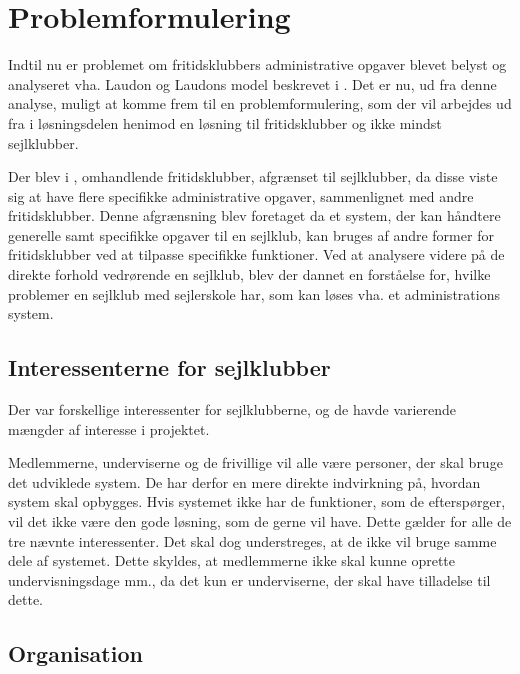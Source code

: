 \chapter{Problemformulering}\label{chap:problemformulering-new}

Indtil nu er problemet om fritidsklubbers administrative opgaver blevet belyst og analyseret vha. Laudon og Laudons model beskrevet i . 
Det er nu, ud fra denne analyse, muligt at komme frem til en problemformulering, som der vil arbejdes ud fra i løsningsdelen henimod en løsning til fritidsklubber og ikke mindst sejlklubber.

Der blev i , omhandlende fritidsklubber, afgrænset til sejlklubber, da disse viste sig at have flere specifikke administrative opgaver, sammenlignet med andre fritidsklubber. 
Denne afgrænsning blev foretaget da et system, der kan håndtere generelle samt specifikke opgaver til en sejlklub, kan bruges af andre former for fritidsklubber ved at tilpasse specifikke funktioner.
Ved at analysere videre på de direkte forhold vedrørende en sejlklub, blev der dannet en forståelse for, hvilke problemer en sejlklub med sejlerskole har, som kan løses vha. et administrations system.


\section{Interessenterne for sejlklubber}

Der var forskellige interessenter for sejlklubberne, og de havde varierende mængder af interesse i projektet. 

Medlemmerne, underviserne og de frivillige vil alle være personer, der skal bruge det udviklede system. 
De har derfor en mere direkte indvirkning på, hvordan system skal opbygges. 
Hvis systemet ikke har de funktioner, som de efterspørger, vil det ikke være den gode løsning, som de gerne vil have. 
Dette gælder for alle de tre nævnte interessenter. 
Det skal dog understreges, at de ikke vil bruge samme dele af systemet. 
Dette skyldes, at medlemmerne ikke skal kunne oprette undervisningsdage mm., da det kun er underviserne, der skal have tilladelse til dette. 

\section{Organisation}

